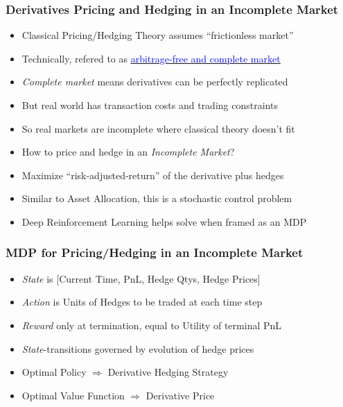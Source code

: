 \documentclass[handout]{beamer}
\begin{document}
\begin{frame}
\frametitle{Derivatives Pricing and Hedging in an Incomplete Market}
\pause
\begin{itemize}[<+->]
\item Classical Pricing/Hedging Theory assumes ``frictionless market''
\item Technically, refered to as \href{https://github.com/coverdrive/technical-documents/blob/master/finance/ArbitrageCompleteness.pdf}{\underline{\textcolor{blue}{arbitrage-free and complete market}}}
\item {\em Complete market} means derivatives can be perfectly replicated
\item But real world has transaction costs and trading constraints
\item So real markets are incomplete where classical theory doesn't fit
\item How to price and hedge in an {\em Incomplete Market}?
\item Maximize ``risk-adjusted-return'' of the derivative plus hedges
\item Similar to Asset Allocation, this is a stochastic control problem
\item Deep Reinforcement Learning helps solve when framed as an MDP 
\end{itemize}
\end{frame}

\begin{frame}
\frametitle{MDP for Pricing/Hedging in an Incomplete Market}
\pause
\begin{itemize}[<+->]
\item {\em State} is [Current Time, PnL, Hedge Qtys, Hedge Prices]
\item {\em Action} is Units of Hedges to be traded at each time step
\item {\em Reward} only at termination, equal to Utility of terminal PnL
\item {\em State}-transitions governed by evolution of hedge prices
\item Optimal Policy $\Rightarrow$ Derivative Hedging Strategy
\item Optimal Value Function $\Rightarrow$ Derivative Price
\end{itemize}
\end{frame}
\end{document}
